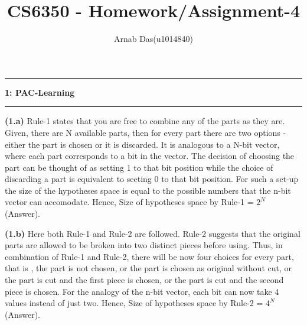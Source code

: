 \documentclass{article}
\title{CS6350 - Homework/Assignment-4}
\author{Arnab Das(u1014840)}
\newcommand\question[2]{\vspace{.25in}\hrule\textbf{#1: #2}\hrule\vspace{.10in}}
\renewcommand\part[1]{\vspace{.10in}\textbf{(#1)}}
\begin{document}
  \maketitle
  \newpage
  \newcommand\NAME{ARNAB DAS}
  \newcommand\UID{uxxxxxxx}
  \newcommand\HWNUM{4}
  
  \question{1}{PAC-Learning}
  \part{1.a} Rule-1 states that you are free to combine any of the parts as they are. Given, there are N available parts, then for every part there are two options - either the part is chosen or it is discarded. It is analogous to a N-bit vector, where each part corresponds to a bit in the vector. The decision of choosing the part can be thought of as setting 1 to that bit position while the choice of discarding a part is equivalent to seeting 0 to that bit position. For such a set-up the size of the hypotheses space is equal to the possible numbers that the n-bit vector can accomodate. Hence,\newline
  \hspace*{0.5cm} Size of hypotheses space by Rule-1 = $2^N$ (Answer). \newline
  
  \part{1.b} Here both Rule-1 and Rule-2 are followed. Rule-2 suggests that the original parts are allowed to be broken into two distinct pieces before using. Thus, in combination of Rule-1 and Rule-2, there will be now four choices for every part, that is , the part is not chosen, or the part is chosen as original without cut, or the part is cut and the first piece is chosen, or the part is cut and the second piece is chosen. For the analogy of the n-bit vector, each bit can now take 4 values instead of just two. Hence, \newline
  \hspace*{0.5cm} Size of hypotheses space by Rule-2 = $4^N$ (Answer). \newline
  
\end{document}
